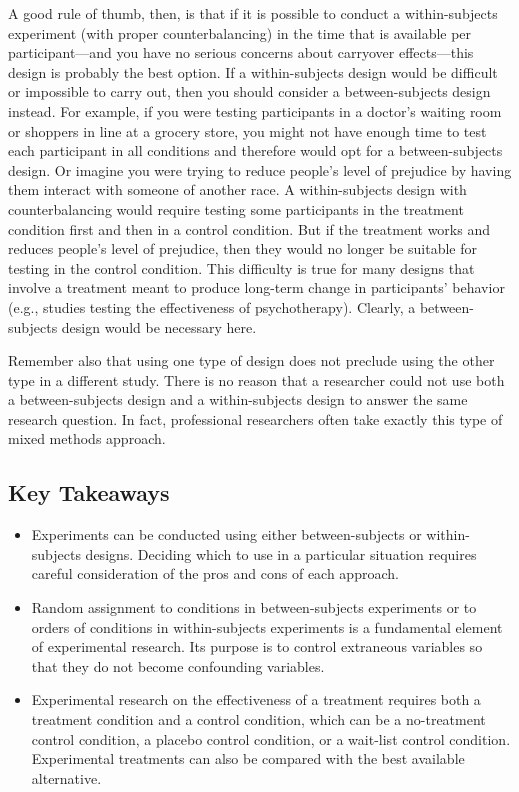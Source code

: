 A good rule of thumb, then, is that if it is possible to conduct a within-subjects experiment (with proper counterbalancing) in the time that is available per participant---and you have no serious concerns about carryover effects---this design is probably the best option. If a within-subjects design would be difficult or impossible to carry out, then you should consider a between-subjects design instead. For example, if you were testing participants in a doctor's waiting room or shoppers in line at a grocery store, you might not have enough time to test each participant in all conditions and therefore would opt for a between-subjects design. Or imagine you were trying to reduce people's level of prejudice by having them interact with someone of another race. A within-subjects design with counterbalancing would require testing some participants in the treatment condition first and then in a control condition. But if the treatment works and reduces people's level of prejudice, then they would no longer be suitable for testing in the control condition. This difficulty is true for many designs that involve a treatment meant to produce long-term change in participants' behavior (e.g., studies testing the effectiveness of psychotherapy). Clearly, a between-subjects design would be necessary here.

Remember also that using one type of design does not preclude using the other type in a different study. There is no reason that a researcher could not use both a between-subjects design and a within-subjects design to answer the same research question. In fact, professional researchers often take exactly this type of mixed methods approach.

\subsection{Key Takeaways}
\begin{fullwidth}
\begin{itemize}

\item Experiments can be conducted using either between-subjects or within-subjects designs. Deciding which to use in a particular situation requires careful consideration of the pros and cons of each approach.
\item Random assignment to conditions in between-subjects experiments or to orders of conditions in within-subjects experiments is a fundamental element of experimental research. Its purpose is to control extraneous variables so that they do not become confounding variables.
\item Experimental research on the effectiveness of a treatment requires both a treatment condition and a control condition, which can be a no-treatment control condition, a placebo control condition, or a wait-list control condition. Experimental treatments can also be compared with the best available alternative.

\end{itemize}
\end{fullwidth}


